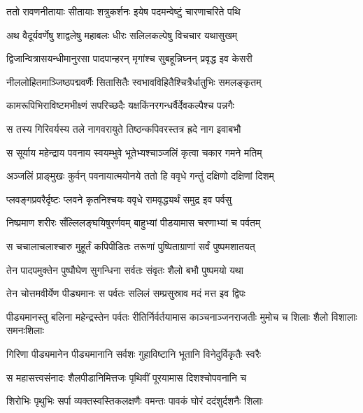 

\twolineshloka
{ततो रावणनीतायाः सीतायाः शत्रुकर्शनः}
{इयेष पदमन्वेष्टुं चारणाचरिते पथि} %

\twolineshloka
{अथ वैदूर्यवर्णेषु शाद्वलेषु महाबलः}
{धीरः सलिलकल्पेषु विचचार यथासुखम्} %

\twolineshloka
{द्विजान्वित्रासयन्धीमानुरसा पादपान्हरन्}
{मृगांश्च सुबहून्निघ्नन् प्रवृद्ध इव केसरी} %

\twolineshloka
{नीललोहितमाञ्जिष्ठपद्मवर्णैः सितासितैः}
{स्वभावविहितैश्चित्रैर्धातुभिः समलङ्कृतम्} %

\twolineshloka
{कामरूपिभिराविष्टमभीक्ष्णं सपरिच्छदैः}
{यक्षकिंनरगन्धर्वैर्देवकल्पैश्च पन्नगैः} %

\twolineshloka
{स तस्य गिरिवर्यस्य तले नागवरायुते}
{तिष्ठन्कपिवरस्तत्र ह्रदे नाग इवाबभौ} %

\twolineshloka
{स सूर्याय महेन्द्राय पवनाय स्वयम्भुवे}
{भूतेभ्यश्चाञ्जलिं कृत्वा चकार गमने मतिम्} %

\twolineshloka
{अञ्जलिं प्राङ्मुखः कुर्वन् पवनायात्मयोनये}
{ततो हि ववृधे गन्तुं दक्षिणो दक्षिणां दिशम्} %

\twolineshloka
{प्लवङ्गप्रवरैर्दृष्टः प्लवने कृतनिश्चयः}
{ववृधे रामवृद्ध्यर्थं समुद्र इव पर्वसु} %

\twolineshloka
{निष्प्रमाण शरीरः सँल्लिलङ्घयिषुरर्णवम्}
{बाहुभ्यां पीडयामास चरणाभ्यां च पर्वतम्} %

\twolineshloka
{स चचालाचलाश्चारु मुहूर्तं कपिपीडितः}
{तरूणां पुष्पिताग्राणां सर्वं पुष्पमशातयत्} %

\twolineshloka
{तेन पादपमुक्तेन पुष्पौघेण सुगन्धिना}
{सर्वतः संवृतः शैलो बभौ पुष्पमयो यथा} %

\twolineshloka
{तेन चोत्तमवीर्येण पीड्यमानः स पर्वतः}
{सलिलं सम्प्रसुस्राव मदं मत्त इव द्विपः} %

\threelineshloka
{पीड्यमानस्तु बलिना महेन्द्रस्तेन पर्वतः}
{रीतिर्निर्वर्तयामास काञ्चनाञ्जनराजतीः}
{मुमोच च शिलाः शैलो विशालाः समनःशिलाः} %

\twolineshloka
{गिरिणा पीड्यमानेन पीड्यमानानि सर्वशः}
{गुहाविष्टानि भूतानि विनेदुर्विकृतैः स्वरैः} %

\twolineshloka
{स महासत्त्वसंनादः शैलपीडानिमित्तजः}
{पृथिवीं पूरयामास दिशश्चोपवनानि च} %

\twolineshloka
{शिरोभिः पृथुभिः सर्पा व्यक्तस्वस्तिकलक्षणैः}
{वमन्तः पावकं घोरं ददंशुर्दशनैः शिलाः} %


